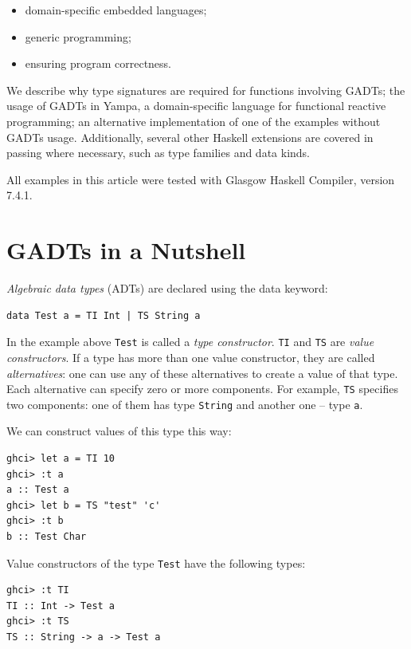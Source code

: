 \documentclass{tmr}
\newcommand{\italic}[1]{\textit{#1}}
\begin{document}
\begin{itemize}
\item domain-specific embedded languages;
\item generic programming;
\item ensuring program correctness.
\end{itemize}

We describe why type signatures are required for functions involving GADTs; the usage of GADTs in Yampa, a domain-specific language for functional reactive programming; an alternative implementation of one of the examples without GADTs usage. Additionally, several other Haskell extensions are covered in passing where necessary, such as type families and data kinds.

All examples in this article were tested with Glasgow Haskell Compiler, version 7.4.1.

\section{GADTs in a Nutshell}
\label{sec:nutshell}

\italic{Algebraic data types} (ADTs) are declared using the data keyword:

\begin{Verbatim}
data Test a = TI Int | TS String a
\end{Verbatim}

In the example above \verb}Test} is called a \italic{type constructor}. \verb|TI| and \verb|TS| are \italic{value constructors}. If a type has more than one value constructor, they are called \italic{alternatives}: one can use any of these alternatives to create a value of that type. Each alternative can specify zero or more components. For example, \verb|TS| specifies two components: one of them has type \verb|String| and another one -- type \verb|a|.

We can construct values of this type this way:

\begin{Verbatim}
ghci> let a = TI 10
ghci> :t a
a :: Test a
ghci> let b = TS "test" 'c'
ghci> :t b
b :: Test Char
\end{Verbatim}

Value constructors of the type \verb|Test| have the following types:

\begin{Verbatim}
ghci> :t TI
TI :: Int -> Test a
ghci> :t TS
TS :: String -> a -> Test a
\end{Verbatim}
\end{document}
